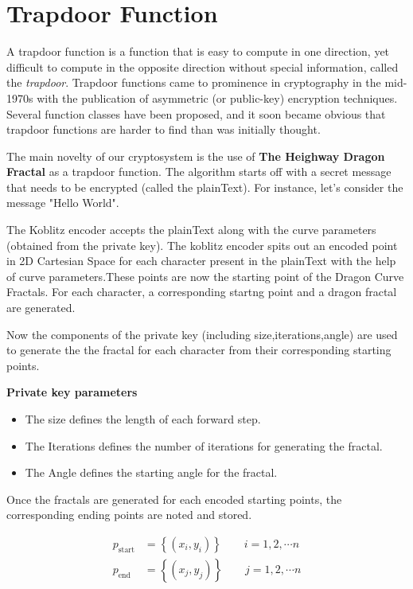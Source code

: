 \documentclass[a4paper,12pt]{article}
\begin{document}
\section{Trapdoor Function}
\begin{flushleft}
A trapdoor function is a function that is easy to compute in one direction, yet difficult to compute in the opposite direction without special information, called the \textit{trapdoor}. Trapdoor functions came to prominence in cryptography in the mid-1970s with the publication of asymmetric (or public-key) encryption techniques. Several function classes have been proposed, and it soon became obvious that trapdoor functions are harder to find than was initially thought.
\end{flushleft}

\begin{flushleft}
The main novelty of our cryptosystem is the use of \textbf{The Heighway Dragon Fractal} as a trapdoor function. The algorithm starts off with a secret message that needs to be encrypted (called the plainText). For instance, let's consider the message "Hello World".
\end{flushleft}

\begin{flushleft}
The Koblitz encoder accepts the plainText along with the curve parameters (obtained from the private key). The koblitz encoder spits out an encoded point in 2D Cartesian Space for each character present in the plainText with the help of curve parameters.These points are now the starting point of the Dragon Curve Fractals. For each character, a corresponding startng point and a dragon fractal are generated.
\end{flushleft}

\begin{flushleft}
Now the components of the private key (including size,iterations,angle) are used to generate the the fractal for each character from their corresponding starting points.
\end{flushleft}

\begin{flushleft}
\textbf{Private key parameters}
\begin{itemize}
	\item The size defines the length of each forward step.
	\item The Iterations defines the number of iterations for generating the fractal.
	\item The Angle defines the starting angle for the fractal. 
\end{itemize}
\end{flushleft}

\begin{flushleft}
Once the fractals are generated for each encoded starting points, the corresponding ending points are noted and stored.

\begin{align*}
	p_{\text{start}}&=\left\{(x_i,y_i)\right\}\qquad i=1,2,\cdots n\\
	p_{\text{end}}&=\left\{(x_j,y_j)\right\}\qquad j=1,2,\cdots n
\end{align*}
\end{flushleft}
\end{document}

